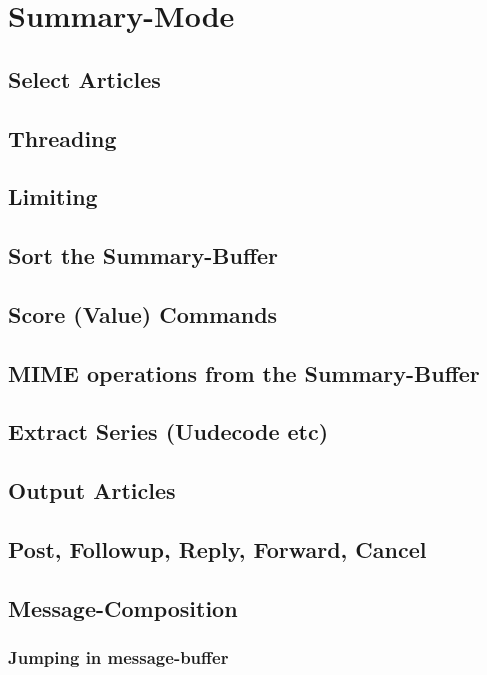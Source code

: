 \documentclass{article}
\begin{document}
\section*{Summary-Mode}
\SummaryModeGeneral
    \subsection*{Select Articles}
    \SelectArticles
%
    \subsection*{Threading}
    \Threading
%
    \subsection*{Limiting}
    \Limiting
    \subsection*{Sort the Summary-Buffer}
    \SortSummary
    \subsection*{Score (Value) Commands}
    \Scoring
% 
    \subsection*{MIME operations from the Summary-Buffer}
    \MIMESummary
    \subsection*{Extract Series (Uudecode etc)}
    \ExtractSeries
    \subsection*{Output Articles}
    \OutputArticles
%
    \subsection*{Post, Followup, Reply, Forward, Cancel}
    \PostReplyetc
    \subsection*{Message-Composition}
    \MsgCompositionGeneral
        \subsubsection*{Jumping in message-buffer}
        \MsgCompositionMovementArticle
\end{document}
